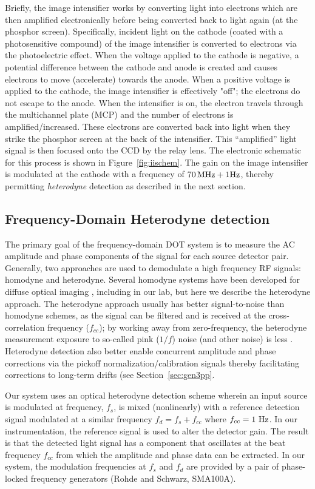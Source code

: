 Briefly, the image intensifier works by converting light into electrons which are then amplified electronically before being converted back to light again (at the phosphor screen). Specifically, incident light on the cathode (coated with a photosensitive compound) of the image intensifier is converted to electrons via the photoelectric effect. When the voltage applied to the cathode is negative, a potential difference between the cathode and anode is created and causes electrons to move (accelerate) towards the anode. When a positive voltage is applied to the cathode, the image intensifier is effectively "off"; the electrons do not escape to the anode. When the intensifier is on, the electron travels through the multichannel plate (MCP) and the number of electrons is amplified/increased. These electrons are converted back into light when they strike the phosphor screen at the back of the intensifier. This “amplified” light signal is then focused onto the CCD by the relay lens. The electronic schematic for this process is shown in Figure~\ref{fig:iischem}. The gain on the image intensifier is modulated at the cathode with a frequency of $70\,{\rm MHz} + 1 {\rm Hz}$, thereby permitting \textit{heterodyne} detection as described in the next section.
%
\subsection{Frequency-Domain Heterodyne detection}
\label{sec:heterodyne}
The primary goal of the frequency-domain DOT system is to measure the AC amplitude and phase components of the signal for each source detector pair. Generally, two approaches are used to demodulate a high frequency RF signals: homodyne and heterodyne. Several homodyne systems have been developed for diffuse optical imaging \cite{Troy1996,Sevick-Muraca1997,Godavarty2003}, including in our lab, but here we describe the heterodyne approach. The heterodyne approach usually has better signal-to-noise than homodyne schemes, as the signal can be filtered and is received at the cross-correlation frequency ($f_{cc}$); by working away from zero-frequency, the heterodyne measurement exposure to so-called pink ($1/f$) noise (and other noise) is less \cite{Venugopal2012}. Heterodyne detection also better enable concurrent amplitude and phase corrections via the pickoff normalization/calibration signals thereby facilitating corrections to long-term drifts (see Section~\ref{sec:gen3pp}.

Our system uses an optical heterodyne detection scheme wherein an input source is modulated at frequency, $f_{s}$, is mixed (nonlinearly) with a reference detection signal modulated at a similar frequency $f_d=f_{s}+f_{cc}$ where $f_{cc}=1~{\rm Hz}$. In our instrumentation, the reference signal is used to alter the detector gain. The result is that the detected light signal has a component that oscillates at the beat frequency $f_{cc}$ from which the amplitude and phase data can be extracted. In our system, the modulation frequencies at $f_{s}$ and  $f_{d}$ are provided by a pair of phase-locked frequency generators (Rohde and Schwarz, SMA100A). 

